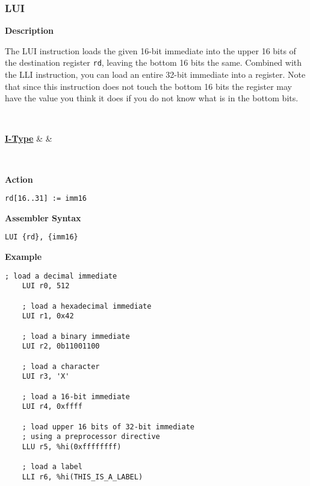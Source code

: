 \subsubsection{LUI }\label{sec:LUI}

\textbf{Description}

The LUI instruction loads the given 16-bit immediate into the upper 16 bits of the destination register \texttt{rd}, leaving the bottom 16 bits the same.
Combined with the LLI instruction, you can load an entire 32-bit immediate into a register.
Note that since this instruction does not touch the bottom 16 bits the register may have the value you think it does if you do not know what is in the bottom bits.

\vspace{3ex}

\begin{center}
	\begin{bytefield}[leftcurly=., leftcurlyspace=0pt]{32}
		 \\
		\begin{leftwordgroup}{\hyperref[sec:i-type]{\textbf{I-Type}}}
		 & 
		 &
		\end{leftwordgroup}\\
	\end{bytefield}
\end{center}

\vspace{3ex}

\textbf{Action}
\begin{lstlisting}[frame=single]
	rd[16..31] := imm16
\end{lstlisting}

\vspace{3ex}

\textbf{Assembler Syntax}
\begin{lstlisting}[frame=single]
	LUI {rd}, {imm16}
\end{lstlisting}

\vspace{3ex}

\textbf{Example}
\begin{lstlisting}[frame=single]
	; load a decimal immediate
	LUI r0, 512
	
	; load a hexadecimal immediate
	LUI r1, 0x42
	
	; load a binary immediate
	LUI r2, 0b11001100
	
	; load a character
	LUI r3, 'X'
	
	; load a 16-bit immediate
	LUI r4, 0xffff
	
	; load upper 16 bits of 32-bit immediate
	; using a preprocessor directive
	LLU r5, %hi(0xffffffff)
	
	; load a label
	LLI r6, %hi(THIS_IS_A_LABEL)
\end{lstlisting}


